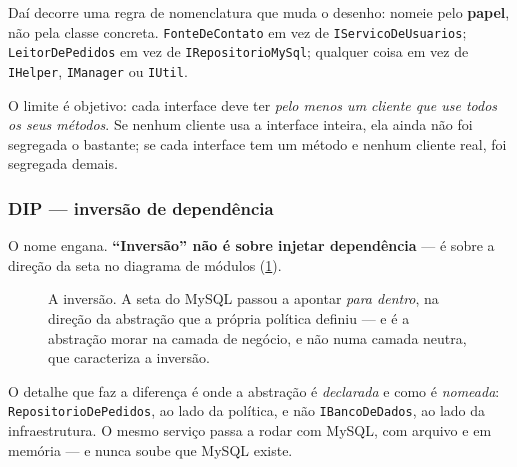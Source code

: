 Daí decorre uma regra de nomenclatura que muda o desenho: nomeie pelo
\textbf{papel}, não pela classe concreta. \texttt{FonteDeContato} em vez de
\texttt{IServicoDeUsuarios}; \texttt{LeitorDePedidos} em vez de
\texttt{IRepositorioMySql}; qualquer coisa em vez de \texttt{IHelper},
\texttt{IManager} ou \texttt{IUtil}.

\begin{armadilha}
O limite é objetivo: cada interface deve ter \emph{pelo menos um cliente que use
todos os seus métodos}. Se nenhum cliente usa a interface inteira, ela ainda não
foi segregada o bastante; se cada interface tem um método e nenhum cliente
real, foi segregada demais.
\end{armadilha}

\subsubsection{DIP --- inversão de dependência}

O nome engana. \textbf{``Inversão'' não é sobre injetar dependência} --- é sobre
a direção da seta no diagrama de módulos (\cref{fig:dip}).

\begin{figure}[htbp]
\centering
{}
\caption{A inversão. A seta do MySQL passou a apontar \emph{para dentro}, na
         direção da abstração que a própria política definiu --- e é a
         abstração morar na camada de negócio, e não numa camada neutra, que
         caracteriza a inversão.}
\label{fig:dip}
\end{figure}

O detalhe que faz a diferença é onde a abstração é \emph{declarada} e como é
\emph{nomeada}: \texttt{RepositorioDePedidos}, ao lado da política, e não
\texttt{IBancoDeDados}, ao lado da infraestrutura. O mesmo serviço passa a rodar
com MySQL, com arquivo e em memória --- e nunca soube que MySQL existe.

